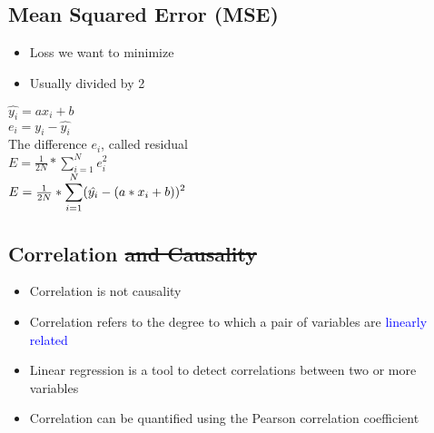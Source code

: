 \subsection{Mean Squared Error (MSE)}
\begin{itemize}
    \item Loss we want to minimize
    \item Usually divided by 2
\end{itemize}
\begin{center}
    $\hat{y_i} = ax_i + b$\\
    $e_i = y_i - \hat{y_i}$ \\
    The difference $e_i$, called residual\\
    $E = \frac{1}{2N} * \displaystyle\sum_{i = 1}^{N} e_i^2$\\
    $E = \frac{1}{2N} * \large\displaystyle\sum_{i = 1}^{N}(\hat{y_i} - (a*x_i + b))^2$
\end{center}

\subsection{Correlation \sout{and Causality}}
\begin{itemize}
    \item Correlation is not causality
    \item Correlation refers to the degree to which a pair of variables are \textcolor{blue}{linearly related}
    \item Linear regression is a tool to detect correlations between two or more variables
    \item Correlation can be quantified using the Pearson correlation coefficient
\end{itemize}
